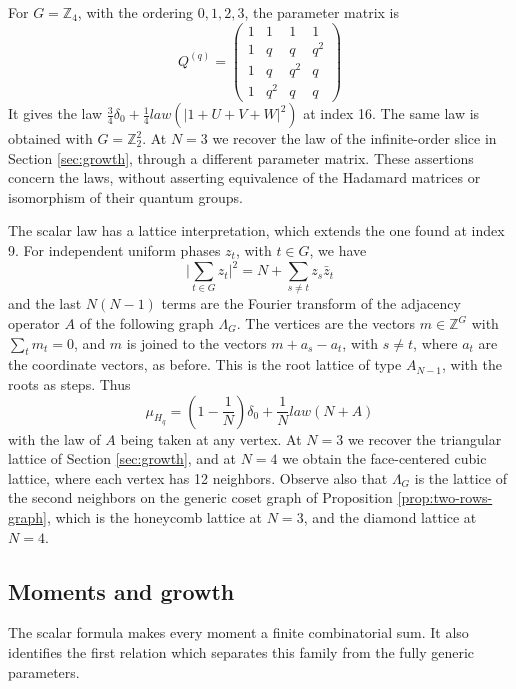 \documentclass[11pt,reqno]{amsart}
\theoremstyle{definition}
\numberwithin{equation}{section}
\begin{document}
For $G=\mathbb Z_4$, with the ordering $0,1,2,3$, the parameter matrix is
$$Q^{(q)}=\begin{pmatrix}1&1&1&1\\1&q&q&q^2\\1&q&q^2&q\\1&q^2&q&q\end{pmatrix}$$
It gives the law $\frac34\delta_0+\frac14 law(|1+U+V+W|^2)$ at index 16. The same law is obtained with $G=\mathbb Z_2^2$. At $N=3$ we recover the law of the infinite-order slice in Section \ref{sec:growth}, through a different parameter matrix. These assertions concern the laws, without asserting equivalence of the Hadamard matrices or isomorphism of their quantum groups.

The scalar law has a lattice interpretation, which extends the one found at index 9. For independent uniform phases $z_t$, with $t\in G$, we have
$$\Big|\sum_{t\in G}z_t\Big|^2=N+\sum_{s\neq t}z_s\bar z_t$$
and the last $N(N-1)$ terms are the Fourier transform of the adjacency operator $A$ of the following graph $\Lambda_G$. The vertices are the vectors $m\in\mathbb Z^G$ with $\sum_tm_t=0$, and $m$ is joined to the vectors $m+a_s-a_t$, with $s\neq t$, where $a_t$ are the coordinate vectors, as before. This is the root lattice of type $A_{N-1}$, with the roots as steps. Thus
$$\mu_{H_q}=\left(1-\frac1N\right)\delta_0+\frac1N law(N+A)$$
with the law of $A$ being taken at any vertex. At $N=3$ we recover the triangular lattice of Section \ref{sec:growth}, and at $N=4$ we obtain the face-centered cubic lattice, where each vertex has 12 neighbors. Observe also that $\Lambda_G$ is the lattice of the second neighbors on the generic coset graph of Proposition \ref{prop:two-rows-graph}, which is the honeycomb lattice at $N=3$, and the diamond lattice at $N=4$.

\subsection{Moments and growth}

The scalar formula makes every moment a finite combinatorial sum. It also identifies the first relation which separates this family from the fully generic parameters.
\end{document}
